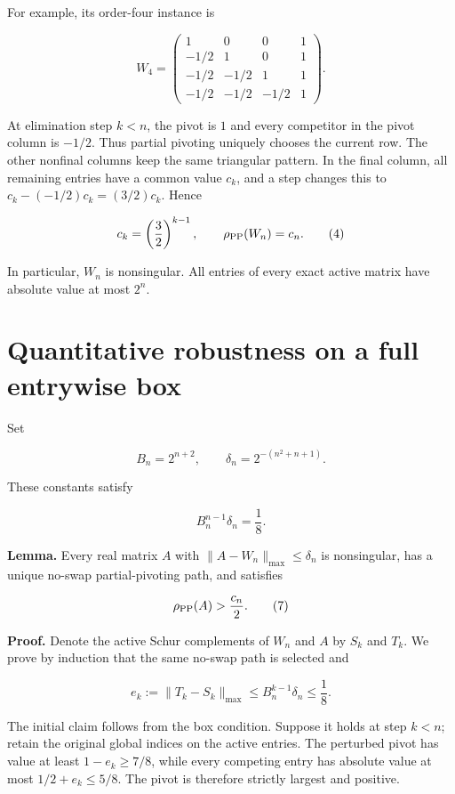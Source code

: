 \documentclass[
  11pt,
  letterpaper,
]{article}
\begin{document}
For example, its order-four instance is

\[
W_4=\begin{pmatrix}
1&0&0&1\\
-1/2&1&0&1\\
-1/2&-1/2&1&1\\
-1/2&-1/2&-1/2&1
\end{pmatrix}.
\]

At elimination step \(k<n\), the pivot is \(1\) and every competitor in
the pivot column is \(-1/2\). Thus partial pivoting uniquely chooses the
current row. The other nonfinal columns keep the same triangular
pattern. In the final column, all remaining entries have a common value
\(c_k\), and a step changes this to \(c_k-(-1/2)c_k=(3/2)c_k\). Hence

\[
c_k=\left(\frac32\right)^{k-1},\qquad
\rho_{\rm PP}(W_n)=c_n.
\tag{4}
\]

In particular, \(W_n\) is nonsingular. All entries of every exact active
matrix have absolute value at most \(2^n\).

\section{Quantitative robustness on a full entrywise
box}\label{quantitative-robustness-on-a-full-entrywise-box}

Set

\[
B_n=2^{n+2},\qquad \delta_n=2^{-(n^2+n+1)}.
\tag{5}
\]

These constants satisfy

\[
B_n^{n-1}\delta_n=\frac18.
\tag{6}
\]

\textbf{Lemma.} Every real matrix \(A\) with
\(\|A-W_n\|_{\max}\leq\delta_n\) is nonsingular, has a unique no-swap
partial-pivoting path, and satisfies

\[
\rho_{\rm PP}(A)>\frac{c_n}{2}.
\tag{7}
\]

\textbf{Proof.} Denote the active Schur complements of \(W_n\) and \(A\)
by \(S_k\) and \(T_k\). We prove by induction that the same no-swap path
is selected and

\[
e_k:=\|T_k-S_k\|_{\max}\leq B_n^{k-1}\delta_n\leq\frac18.
\tag{8}
\]

The initial claim follows from the box condition. Suppose it holds at
step \(k<n\); retain the original global indices on the active entries.
The perturbed pivot has value at least \(1-e_k\geq7/8\), while every
competing entry has absolute value at most \(1/2+e_k\leq5/8\). The pivot
is therefore strictly largest and positive.
\end{document}
